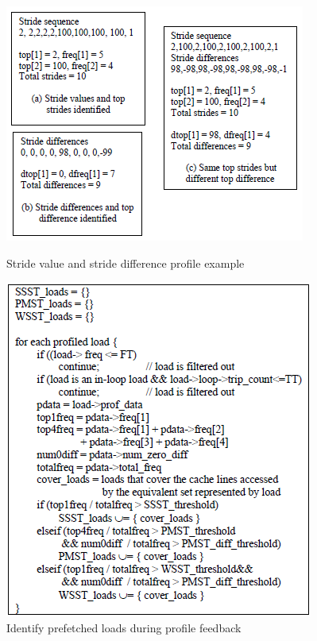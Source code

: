 \documentclass[11pt]{article}
\begin{document}
  \begin{figure}[h]
    \centering
    \begin{minipage} [b] {8cm}
      \includegraphics[scale=0.6]{./img/fig4}
      \caption{Stride value and stride difference profile example\label{fig4}}
    \end{minipage}
    \begin{minipage} [b] {7cm}
      \includegraphics[scale=0.6]{./img/fig5}
      \caption{Identify prefetched loads during profile feedback\label{fig5}}
    \end{minipage}
  \end{figure}
\end{document}
